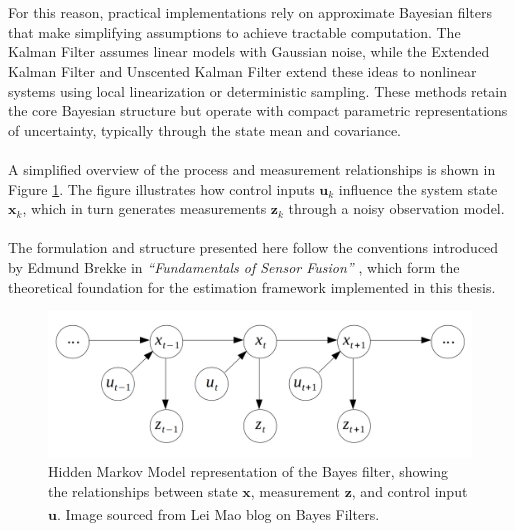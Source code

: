 \\ \\
For this reason, practical implementations rely on approximate Bayesian filters that make simplifying assumptions to achieve tractable computation. The Kalman Filter assumes linear models with Gaussian noise, while the Extended Kalman Filter and Unscented Kalman Filter extend these ideas to nonlinear systems using local linearization or deterministic sampling. These methods retain the core Bayesian structure but operate with compact parametric representations of uncertainty, typically through the state mean and covariance.  
\\ \\
A simplified overview of the process and measurement relationships is shown in Figure \ref{fig:state-estimation-hidden-markov-model}. The figure illustrates how control inputs $\mathbf{u}_k$ influence the system state $\mathbf{x}_k$, which in turn generates measurements $\mathbf{z}_k$ through a noisy observation model.  
\\ \\
The formulation and structure presented here follow the conventions introduced by Edmund Brekke in \textit{``Fundamentals of Sensor Fusion''} \cite{sensor_fusion_book}, which form the theoretical foundation for the estimation framework implemented in this thesis.
\begin{figure}[H]
    \centering
    \includegraphics[width=1.0\linewidth]{Pictures/State_Estimation/Bayes_Filter/Hidden_Markov_Model.png}
    \caption{Hidden Markov Model representation of the Bayes filter, showing the relationships between state $\mathbf{x}$, measurement $\mathbf{z}$, and control input $\mathbf{u}$. Image sourced from Lei Mao blog on Bayes Filters.\textsuperscript{\cite{bayes_filter}}}
    \label{fig:state-estimation-hidden-markov-model}
\end{figure}

